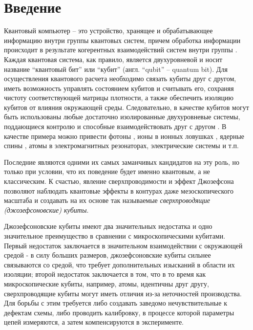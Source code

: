 \documentclass[12pt, twoside]{report}
\numberwithin{equation}{section}
\numberwithin{figure}{section}
\begin{document}

\tableofcontents
\newpage

\chapter{Введение}
Квантовый компьютер -- это устройство, хранящее и обрабатывающее информацию внутри группы квантовых систем, причем обработка информации происходит в результате когерентных взаимодействий систем внутри группы \cite{Lloyd1993}. Каждая квантовая система, как правило, является двухуровневой и носит название ``квантовый бит'' или ``кубит'' (англ. ``qubit'' -- quantum bit). Для осуществления квантового расчета необходимо связать кубиты друг с другом, иметь возможность управлять состоянием кубитов и считывать его, сохраняя чистоту соответствующей матрицы плотности, а также обеспечить изоляцию кубитов от влияния окружающей среды. Следовательно, в качестве кубитов могут быть использованы любые достаточно изолированные двухуровневые системы, поддающиеся контролю и способные взаимодействовать друг с другом \cite{DiVincenzo1995, DiVincenzo2000, Spiller1996}. В качестве примера можно привести фотоны \cite{Milburn2009}, ионы в ионных ловушках \cite{Cirac1995}, ядерные спины \cite{Kane1998}, атомы в электромагнитных резонаторах\cite{Rempe2008},  электрические системы\cite{Devoret2005} и т.п.

Последние являются одними их самых заманчивых кандидатов на эту роль, но только при условии, что их поведение будет именно квантовым, а не классическим\cite{Devoret1995}. К счастью, явление сверхпроводимости и эффект Джозефсона позволяют наблюдать квантовые эффекты в контурах даже мезоскопического масштаба и создавать на их основе так называемые \textit{сверхпроводящие (джозефсоновские) кубиты}\cite{Clarke2008}. 

Джозефсоновские кубиты имеют два значительных недостатка и одно значительное преимущество в сравнении с микроскопическими кубитами. Первый недостаток заключается в значительном взаимодействии с окружающей средой - в силу больших размеров, джозефсоновские кубиты сильнее связываются со средой, что требует дополнительных изысканий в области их изоляции; второй недостаток заключается в том, что в то время как микроскопические кубиты, например, атомы, идентичны друг другу, сверхпроводящие кубиты могут иметь отличия из-за неточностей производства. Для борьбы с этим требуется либо создавать заведомо нечувствительные к дефектам схемы, либо проводить калибровку, в процессе которой параметры цепей измеряются, а затем компенсируются в эксперименте.
\end{document}
